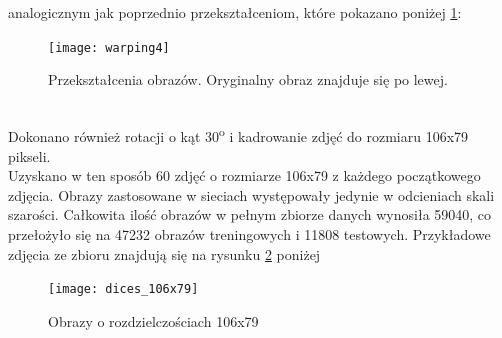 analogicznym jak poprzednio przekształceniom, które pokazano poniżej \ref{fig:warping4}:
\begin{figure}[h!]
\centering
\texttt{[image: warping4]}
\caption{Przekształcenia obrazów. Oryginalny obraz znajduje się po lewej.}
\label{fig:warping4}
\end{figure}\\
Dokonano również rotacji o kąt 30\textsuperscript{o} i kadrowanie zdjęć do rozmiaru 106x79 pikseli.\\
Uzyskano w ten sposób 60 zdjęć o rozmiarze 106x79 z każdego początkowego zdjęcia.
Obrazy zastosowane w sieciach występowały jedynie w odcieniach skali szarości.
Całkowita ilość obrazów w pełnym zbiorze danych wynosiła 59040, co przełożyło się
na 47232 obrazów treningowych i 11808 testowych. Przykładowe zdjęcia ze zbioru znajdują
się na rysunku \ref{fig:rects} poniżej

\begin{figure}[h!]
\centering
\texttt{[image: dices\_106x79]}
\caption{Obrazy o rozdzielczościach 106x79}
\label{fig:rects}
\end{figure}

